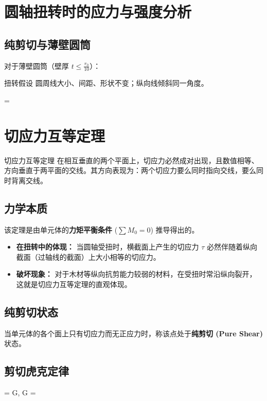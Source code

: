 \section{圆轴扭转时的应力与强度分析}

\subsection{纯剪切与薄壁圆筒}
对于薄壁圆筒（壁厚 $t \le \frac{r_0}{10}$）：
\begin{myhypothesis}{扭转假设}
    圆周线大小、间距、形状不变；纵向线倾斜同一角度。
\end{myhypothesis}
 \begin{myformula}
     \tau = 
\end{myformula}


\section{切应力互等定理 }

\begin{myTheorem}{切应力互等定理}
    在相互垂直的两个平面上，切应力必然成对出现，且数值相等、方向垂直于两平面的交线。其方向表现为：两个切应力要么同时指向交线，要么同时背离交线。
\end{myTheorem}


\subsection{力学本质}
该定理是由单元体的\textbf{力矩平衡条件} ($\sum M_0 = 0$) 推导得出的。
\begin{itemize}
    \item \textbf{在扭转中的体现：} 当圆轴受扭时，横截面上产生的切应力 $\tau$ 必然伴随着纵向截面（过轴线的截面）上大小相等的切应力。
    \item \textbf{破坏现象：} 对于木材等纵向抗剪能力较弱的材料，在受扭时常沿纵向裂开，这就是切应力互等定理的直观体现。
\end{itemize}

\subsection{纯剪切状态}
当单元体的各个面上只有切应力而无正应力时，称该点处于\textbf{纯剪切 (Pure Shear)} 状态。
\subsection{剪切虎克定律}
\begin{myformula}
    \tau = G\gamma, \quad G = 
\end{myformula}

